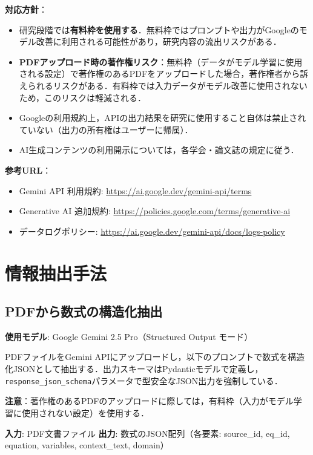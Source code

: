 \documentclass[11pt,a4paper]{ltjsarticle}
\begin{document}
\textbf{対応方針}：
\begin{itemize}[nosep]
  \item 研究段階では\textbf{有料枠を使用する}．無料枠ではプロンプトや出力がGoogleのモデル改善に利用される可能性があり，研究内容の流出リスクがある．
  \item \textbf{PDFアップロード時の著作権リスク}：無料枠（データがモデル学習に使用される設定）で著作権のあるPDFをアップロードした場合，著作権者から訴えられるリスクがある．有料枠では入力データがモデル改善に使用されないため，このリスクは軽減される．
  \item Googleの利用規約上，APIの出力結果を研究に使用すること自体は禁止されていない（出力の所有権はユーザーに帰属）．
  \item AI生成コンテンツの利用開示については，各学会・論文誌の規定に従う．
\end{itemize}

\textbf{参考URL}：
\begin{itemize}[nosep]
  \item Gemini API 利用規約: \url{https://ai.google.dev/gemini-api/terms}
  \item Generative AI 追加規約: \url{https://policies.google.com/terms/generative-ai}
  \item データログポリシー: \url{https://ai.google.dev/gemini-api/docs/logs-policy}
\end{itemize}

\section{情報抽出手法}

\subsection{PDFから数式の構造化抽出}

\textbf{使用モデル}: Google Gemini 2.5 Pro（Structured Output モード）

PDFファイルをGemini APIにアップロードし，以下のプロンプトで数式を構造化JSONとして抽出する．出力スキーマはPydanticモデルで定義し，\texttt{response\_json\_schema}パラメータで型安全なJSON出力を強制している．

\textbf{注意}：著作権のあるPDFのアップロードに際しては，有料枠（入力がモデル学習に使用されない設定）を使用する．

\textbf{入力}: PDF文書ファイル \quad
\textbf{出力}: 数式のJSON配列（各要素: source\_id, eq\_id, equation, variables, context\_text, domain）
\end{document}
